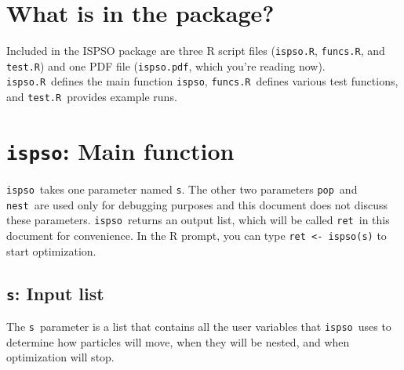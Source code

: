 \documentclass{article}
\def\ispsoR{\texttt{ispso.R}}
\def\funcsR{\texttt{funcs.R}}
\def\testR{\texttt{test.R}}
\def\ispsopdf{\texttt{ispso.pdf}}
\def\ispso{\texttt{ispso}}
\def\s{\texttt{s}}
\def\pop{\texttt{pop}}
\def\nest{\texttt{nest}}
\def\ret{\texttt{ret}}
\begin{document}
\section{What is in the package?}

Included in the ISPSO package are three R script files (\ispsoR, \funcsR, and \testR) and one PDF file (\ispsopdf, which you're reading now).
\ispsoR\ defines the main function \ispso, \funcsR\ defines various test functions, and \testR\ provides example runs.

\section{\ispso: Main function}

\ispso\ takes one parameter named \s.
The other two parameters \pop\ and \nest\ are used only for debugging purposes and this document does not discuss these parameters.
\ispso\ returns an output list, which will be called \ret\ in this document for convenience.
In the R prompt, you can type \texttt{ret <- ispso(s)} to start optimization.

\subsection{\s: Input list}

The \s\ parameter is a list that contains all the user variables that \ispso\ uses to determine how particles will move, when they will be nested, and when optimization will stop.
\end{document}

